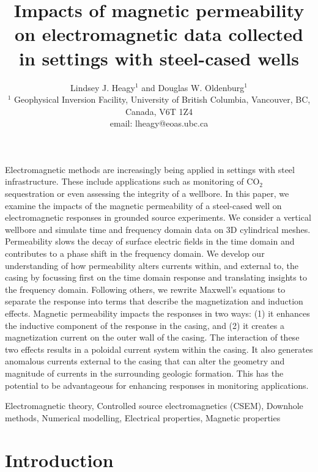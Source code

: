 \documentclass[onecolumn, extra, mreferee]{gji}
\title[EM with conductive, permeable wells]{
  Impacts of magnetic permeability on electromagnetic data collected in settings with steel-cased wells
}
\author[L. J. Heagy and D. W. Oldenburg]{
  Lindsey J. Heagy$^1$ and Douglas W. Oldenburg$^1$\\
  $^1$ Geophysical Inversion Facility, University of British Columbia, Vancouver, BC, Canada, V6T 1Z4
  \\ \quad email: lheagy@eoas.ubc.ca
}
\begin{document}
\label{firstpage}

\maketitle

\begin{summary}

Electromagnetic methods are increasingly being applied in settings with steel infrastructure. These include applications such as monitoring of CO$_2$ sequestration or even assessing the integrity of a wellbore. In this paper, we examine the impacts of the magnetic permeability of a steel-cased well on electromagnetic responses in grounded source experiments. We consider a vertical wellbore and simulate time and frequency domain data on 3D cylindrical meshes. Permeability slows the decay of surface electric fields in the time domain and contributes to a phase shift in the frequency domain. We develop our understanding of how permeability alters currents within, and external to, the casing by focussing first on the time domain response and translating insights to the frequency domain. Following others, we rewrite Maxwell's equations to separate the response into terms that describe the magnetization and induction effects. Magnetic permeability impacts the responses in two ways: (1) it enhances the inductive component of the response in the casing, and (2) it creates a magnetization current on the outer wall of the casing. The interaction of these two effects results in a poloidal current system within the casing. It also generates anomalous currents external to the casing that can alter the geometry and magnitude of currents in the surrounding geologic formation. This has the potential to be advantageous for enhancing responses in monitoring applications.

\end{summary}

\begin{keywords}
Electromagnetic theory, Controlled source electromagnetics (CSEM), Downhole methods, Numerical modelling, Electrical properties, Magnetic properties
\end{keywords}

\linenumbers

\section{Introduction}
\end{document}
